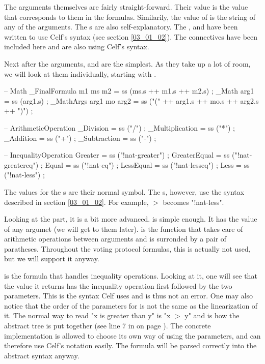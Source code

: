 The arguments themselves are fairly straight-forward. Their value is the value that corresponds to them in the formulas. Similarily, the value of  is the string of any of the arguments. The s are also self-explanatory. The ,  and  have been written to use Celf's syntax (see section \ref{03_01_02}). The connectives have been included here and are also using Celf's syntax.

Next after the arguments,  and  are the simplest. As they take up a lot of room, we will look at them individually, starting with .
\begin{lstgf}
        -- Math
        _FinalFormula m1 ms m2          = ss (ms.s ++ m1.s ++ m2.s) ;
        _Math arg1                      = ss (arg1.s) ;
        _MathArgs arg1 mo arg2          = ss ("(" ++ arg1.s ++ mo.s ++ arg2.s ++ ")") ;

        -- ArithmeticOperation
        _Division                       = ss ("/") ;
        _Multiplication                 = ss ("*") ;
        _Addition                       = ss ("+") ;
        _Subtraction                    = ss ("-") ;

        -- InequalityOperation
        Greater                         = ss ("!nat-greater") ;
        GreaterEqual                    = ss ("!nat-greatereq") ;
        Equal                           = ss ("!nat-eq") ;
        LessEqual                       = ss ("!nat-lesseq") ;
        Less                            = ss ("!nat-less") ;
\end{lstgf}
The values for the s are their normal symbol. The s, however, use the syntax described in section \ref{03_01_02}. For example, $>$ becomes "!nat-less".

Looking at the  part, it is a bit more advanced.  is simple enough. It has the value of any argumet (we will get to them later).  is the function that takes care of arithmetic operations between arguments and is surronded by a pair of paratheses. Throughout the voting protocol formulas, this is actually not used, but we will support it anyway.

 is the formula that handles inequality operations. Looking at it, one will see that the value it returns has the inequality operation first followed by the two parameters. This is the syntax Celf uses and is thus not an error. One may also notice that the order of the parameters for  is not the same as the linearization of it. The normal way to read "x is greater than y" is "x $>$ y" and is how the abstract tree is put together (see line 7 in  on page \pageref{code:04_01_C04}). The concrete implementation is allowed to choose its own way of using the parameters, and can therefore use Celf's notation easily. The formula will be parsed correctly into the abstract syntax anyway.

